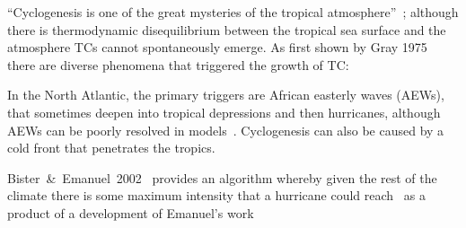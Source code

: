 
``Cyclogenesis is one of the great
 mysteries of the tropical atmosphere''~\cite{emanuel2018progress};
although there is thermodynamic disequilibrium between the tropical sea
surface and the atmosphere TCs cannot spontaneously emerge. As first shown by
Gray 1975~\cite{gray1975tropical} there are
 diverse phenomena that triggered the growth of TC:

 In the North Atlantic, the primary triggers are African easterly waves (AEWs),
 that sometimes deepen into tropical depressions and then hurricanes,
 although AEWs can be poorly resolved in models~\cite{tomassini2017interaction}.
 Cyclogenesis can also be caused by a cold front that penetrates the tropics.


Bister~\&~Emanuel~2002~\cite{bister2002low} provides an algorithm whereby given the rest of the climate
there is some maximum intensity that a hurricane could reach~\cite{bister2002low}
as a product of a development of Emanuel's work~\cite{bister1996development,
bister1998dissipative, bister2002low}
